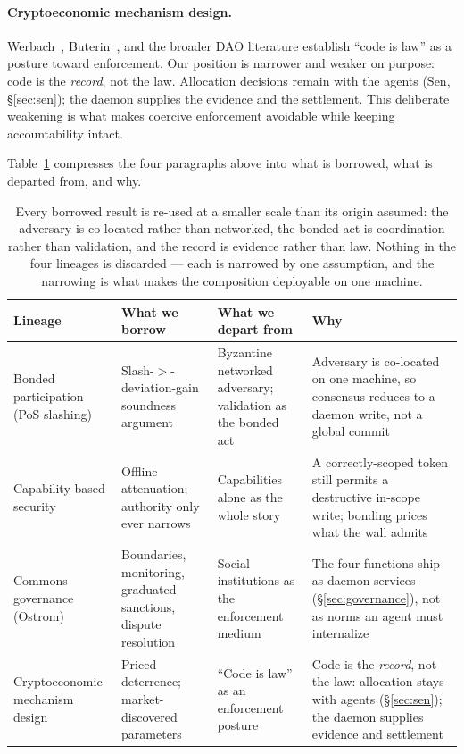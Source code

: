 \documentclass[11pt,a4paper]{article}
\theoremstyle{definition}
\theoremstyle{remark}
\begin{document}
\paragraph{Cryptoeconomic mechanism design.} Werbach~\cite{werbach2018blockchain}, Buterin~\cite{buterin2014ethereum}, and the broader DAO literature establish ``code is law'' as a posture toward enforcement. Our position is narrower and weaker on purpose: code is the \emph{record}, not the law. Allocation decisions remain with the agents (Sen, \S\ref{sec:sen}); the daemon supplies the evidence and the settlement. This deliberate weakening is what makes coercive enforcement avoidable while keeping accountability intact.

Table~\ref{tab:related-borrow} compresses the four paragraphs above into what is borrowed, what is departed from, and why.

\begin{table}[H]
\centering
\caption{Every borrowed result is re-used at a smaller scale than its origin assumed: the adversary is co-located rather than networked, the bonded act is coordination rather than validation, and the record is evidence rather than law. Nothing in the four lineages is discarded --- each is narrowed by one assumption, and the narrowing is what makes the composition deployable on one machine.}
\label{tab:related-borrow}
\small
\begin{tabularx}{\textwidth}{@{}>{\raggedright\arraybackslash}p{} >{\raggedright\arraybackslash}X >{\raggedright\arraybackslash}X >{\raggedright\arraybackslash}X@{}}
\toprule
\textbf{Lineage} & \textbf{What we borrow} & \textbf{What we depart from} & \textbf{Why} \\
\midrule
Bonded participation (PoS slashing) & Slash-$>$-deviation-gain soundness argument & Byzantine networked adversary; validation as the bonded act & Adversary is co-located on one machine, so consensus reduces to a daemon write, not a global commit \\
Capability-based security & Offline attenuation; authority only ever narrows & Capabilities alone as the whole story & A correctly-scoped token still permits a destructive in-scope write; bonding prices what the wall admits \\
Commons governance (Ostrom) & Boundaries, monitoring, graduated sanctions, dispute resolution & Social institutions as the enforcement medium & The four functions ship as daemon services (\S\ref{sec:governance}), not as norms an agent must internalize \\
Cryptoeconomic mechanism design & Priced deterrence; market-discovered parameters & ``Code is law'' as an enforcement posture & Code is the \emph{record}, not the law: allocation stays with agents (\S\ref{sec:sen}); the daemon supplies evidence and settlement \\
\bottomrule
\end{tabularx}
\end{table}
\end{document}
